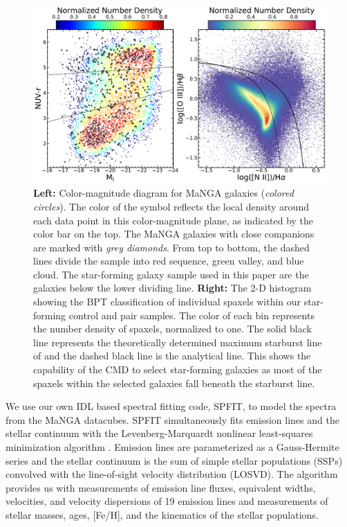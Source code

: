 \documentclass[iop,revtex4,twocolumn,apj,numberedappendix,appendixfloats]{emulateapj}
\begin{document}
\begin{figure}
\centering
\includegraphics[width=\linewidth]{fig/bpt-cmd.pdf}
\caption[]{\textbf{Left:} Color-magnitude diagram for MaNGA galaxies ({\it colored circles}). The color of the symbol reflects the local density around each data point in this color-magnitude plane, as indicated by the color bar on the top. The MaNGA galaxies with close companions are marked with {\it grey diamonds}. From top to bottom, the dashed lines divide the sample into red sequence, green valley, and blue cloud. The star-forming galaxy sample used in this paper are the galaxies below the lower dividing line. \textbf{Right:} The 2-D histogram showing the BPT classification \citep{Baldwin:1981} of individual spaxels within our star-forming control and pair samples. The color of each bin represents the number density of spaxels, normalized to one. The solid black line represents the theoretically determined maximum starburst line of \citet{Kewley:2001} and the dashed black line is the analytical \citet{Kauffmann:2003} line. This shows the capability of the CMD to select star-forming galaxies as most of the spaxels within the selected galaxies fall beneath the starburst line.}
\label{fig:cmd}
\end{figure}

We use our own {\sc IDL} based spectral fitting code, {\sc SPFIT}, to model the spectra from the MaNGA datacubes. {\sc SPFIT} simultaneously fits emission lines and the stellar continuum with the Levenberg-Marquardt nonlinear least-squares minimization algorithm \citep{Fu:2018}. Emission lines are parameterized as a Gauss-Hermite series and the stellar continuum is the sum of simple stellar populations (SSPs) convolved with the line-of-sight velocity distribution (LOSVD). The algorithm provides us with measurements of emission line fluxes, equivalent widths, velocities, and velocity dispersions of 19 emission lines and measurements of stellar masses, ages, [Fe/H], and the kinematics of the stellar populations. 
\end{document}
